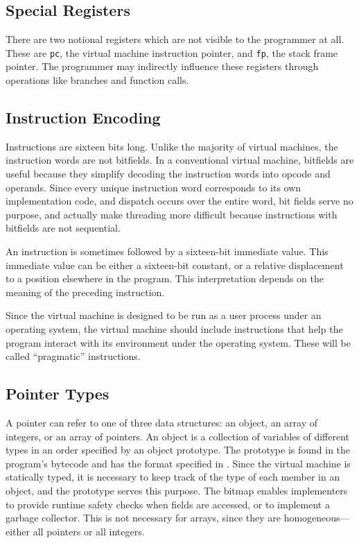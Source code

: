 		\subsection{Special Registers}
		There are two notional registers which are not visible to the programmer at all. These are \texttt{pc}, the virtual machine instruction pointer, and \texttt{fp}, the stack frame pointer. The programmer may indirectly influence these registers through operations like branches and function calls.
		
		\subsection{Instruction Encoding}
		Instructions are sixteen bits long. Unlike the majority of virtual machines, the instruction words are not bitfields. In a conventional virtual machine, bitfields are useful because they simplify decoding the instruction words into opcode and operands. Since every unique instruction word corresponds to its own implementation code, and dispatch occurs over the entire word, bit fields serve no purpose, and actually make  threading more difficult because instructions with bitfields are not sequential.
		
		An instruction is sometimes followed by a sixteen-bit immediate value. This immediate value can be either a sixteen-bit constant, or a relative displacement to a position elsewhere in the program. This interpretation depends on the meaning of the preceding instruction.
		
		Since the virtual machine is designed to be run as a user process under an operating system, the virtual machine should include instructions that help the program interact with its environment under the operating system. These will be called ``pragmatic'' instructions.
		
		\subsection{Pointer Types}
		A pointer can refer to one of three data structures: an object, an array of integers, or an array of pointers. An object is a collection of variables of different types in an order specified by an object prototype. The prototype is found in the program's bytecode and has the format specified in . Since the virtual machine is statically typed, it is necessary to keep track of the type of each member in an object, and the prototype serves this purpose. The bitmap enables implementers to provide runtime safety checks when fields are accessed, or to implement a garbage collector. This is not necessary for arrays, since they are homogeneous---either all pointers or all integers.
		
